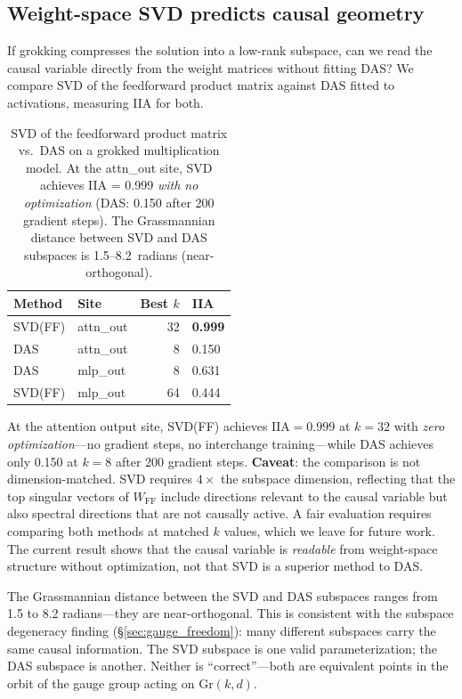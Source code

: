 \documentclass{article}
\newcommand{\Gr}{\mathrm{Gr}}
\newcommand{\IIA}{\mathrm{IIA}}
\begin{document}
\subsection{Weight-space SVD predicts causal geometry}
\label{sec:svd_vs_das}

If grokking compresses the solution into a low-rank subspace, can we read the
causal variable directly from the weight matrices without fitting DAS? We
compare SVD of the feedforward product matrix against DAS fitted to
activations, measuring IIA for both.

\begin{table}[t]
\centering
\small
\begin{tabular}{llrl}
\toprule
Method & Site & Best $k$ & IIA \\
\midrule
SVD(FF) & attn\_out & 32 & \textbf{0.999} \\
DAS     & attn\_out & 8  & 0.150 \\
DAS     & mlp\_out  & 8  & 0.631 \\
SVD(FF) & mlp\_out  & 64 & 0.444 \\
\bottomrule
\end{tabular}
\caption{SVD of the feedforward product matrix vs.\ DAS on a grokked
multiplication model. At the attn\_out site, SVD achieves IIA = 0.999
\emph{with no optimization} (DAS: 0.150 after 200 gradient steps).
The Grassmannian distance between SVD and DAS subspaces is
1.5--8.2~radians (near-orthogonal).}
\label{tab:svd_vs_das}
\end{table}

At the attention output site, SVD(FF) achieves $\IIA = 0.999$ at $k = 32$
with \emph{zero optimization}---no gradient steps, no interchange
training---while DAS achieves only 0.150 at $k = 8$ after 200 gradient
steps. \textbf{Caveat}: the comparison is not dimension-matched. SVD
requires $4\times$ the subspace dimension, reflecting that the top singular
vectors of $W_\text{FF}$ include directions relevant to the causal variable
but also spectral directions that are not causally active. A fair evaluation
requires comparing both methods at matched $k$ values, which we leave for
future work. The current result shows that the causal variable is
\emph{readable} from weight-space structure without optimization, not that
SVD is a superior method to DAS.

The Grassmannian distance between the SVD and DAS subspaces ranges from
1.5 to 8.2 radians---they are near-orthogonal. This is consistent with
the subspace degeneracy finding (\S\ref{sec:gauge_freedom}): many different
subspaces carry the same causal information. The SVD subspace is one
valid parameterization; the DAS subspace is another. Neither is
``correct''---both are equivalent points in the orbit of the gauge
group acting on $\Gr(k,d)$.
\end{document}
